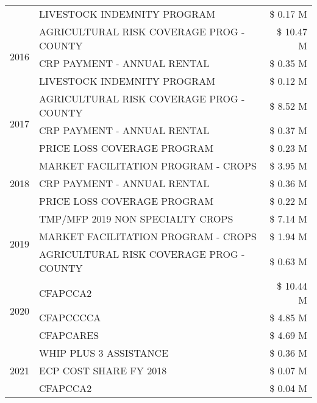 \begin{tabular}{llr}
 & LIVESTOCK INDEMNITY PROGRAM & \$ 0.17 M \\
\cline{1-3}
\multirow[t]{3}{*}{2016} & AGRICULTURAL RISK COVERAGE PROG - COUNTY & \$ 10.47 M \\
 & CRP PAYMENT - ANNUAL RENTAL & \$ 0.35 M \\
 & LIVESTOCK INDEMNITY PROGRAM & \$ 0.12 M \\
\cline{1-3}
\multirow[t]{3}{*}{2017} & AGRICULTURAL RISK COVERAGE PROG - COUNTY & \$ 8.52 M \\
 & CRP PAYMENT - ANNUAL RENTAL & \$ 0.37 M \\
 & PRICE LOSS COVERAGE PROGRAM & \$ 0.23 M \\
\cline{1-3}
\multirow[t]{3}{*}{2018} & MARKET FACILITATION PROGRAM - CROPS & \$ 3.95 M \\
 & CRP PAYMENT - ANNUAL RENTAL & \$ 0.36 M \\
 & PRICE LOSS COVERAGE PROGRAM & \$ 0.22 M \\
\cline{1-3}
\multirow[t]{3}{*}{2019} & TMP/MFP 2019 NON SPECIALTY CROPS & \$ 7.14 M \\
 & MARKET FACILITATION PROGRAM - CROPS & \$ 1.94 M \\
 & AGRICULTURAL RISK COVERAGE PROG - COUNTY & \$ 0.63 M \\
\cline{1-3}
\multirow[t]{3}{*}{2020} & CFAPCCA2 & \$ 10.44 M \\
 & CFAPCCCCA & \$ 4.85 M \\
 & CFAPCARES & \$ 4.69 M \\
\cline{1-3}
\multirow[t]{3}{*}{2021} & WHIP PLUS 3 ASSISTANCE & \$ 0.36 M \\
 & ECP COST SHARE FY 2018 & \$ 0.07 M \\
 & CFAPCCA2 & \$ 0.04 M \\
\cline{1-3}
\bottomrule
\end{tabular}
